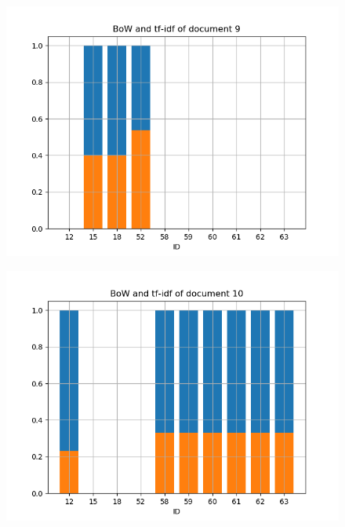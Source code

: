 \documentclass{jsarticle}
\begin{document}
\begin{figure}[h]
 \begin{minipage}[b]{0.50\linewidth}
  \centering
  \includegraphics[keepaspectratio, scale=0.42]
  {./doc_8.png}
  \label{doc_8}
 \end{minipage}
 \begin{minipage}[b]{0.50\linewidth}
  \centering
  \includegraphics[keepaspectratio, scale=0.42]
  {./doc_9.png}
  \label{doc_9}
 \end{minipage}
\end{figure}
\end{document}
